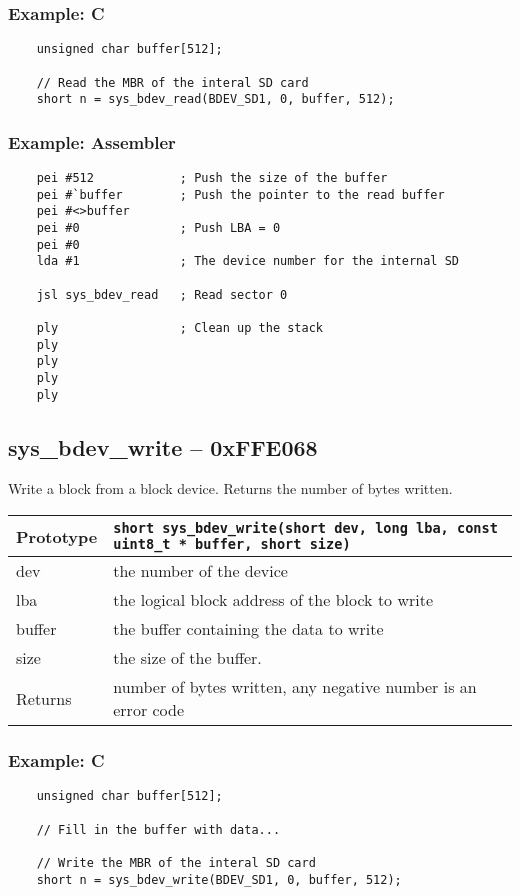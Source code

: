 \subsubsection*{Example: C}
\begin{lstlisting}
    unsigned char buffer[512];
    
    // Read the MBR of the interal SD card
    short n = sys_bdev_read(BDEV_SD1, 0, buffer, 512);
\end{lstlisting}

\subsubsection*{Example: Assembler}
\begin{verbatim}
    pei #512			; Push the size of the buffer
    pei #`buffer		; Push the pointer to the read buffer
    pei #<>buffer
    pei #0				; Push LBA = 0
    pei #0
    lda #1				; The device number for the internal SD

    jsl sys_bdev_read	; Read sector 0

    ply					; Clean up the stack
    ply
    ply
    ply
    ply
\end{verbatim}

\subsection*{sys\_bdev\_write -- 0xFFE068}
Write a block from a block device. Returns the number of bytes written.

\bigskip

\begin{tabular}{|l||l|} \hline
Prototype & \lstinline!short sys_bdev_write(short dev, long lba, const uint8_t * buffer, short size)! \\ \hline
dev & the number of the device \\ \hline
lba & the logical block address of the block to write \\ \hline
buffer & the buffer containing the data to write \\ \hline
size & the size of the buffer. \\ \hline
Returns & number of bytes written, any negative number is an error code \\ \hline
\end{tabular}

\subsubsection*{Example: C}
\begin{lstlisting}
    unsigned char buffer[512];

    // Fill in the buffer with data...
    
    // Write the MBR of the interal SD card
    short n = sys_bdev_write(BDEV_SD1, 0, buffer, 512);
\end{lstlisting}

